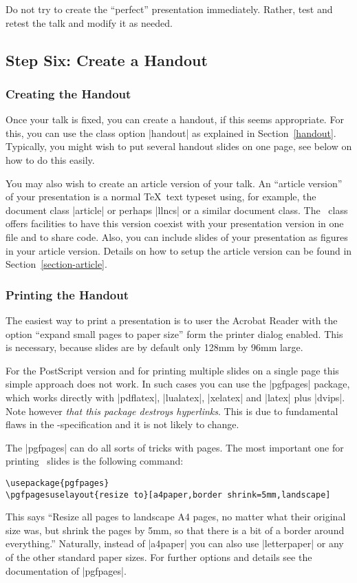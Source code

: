 Do not try to create the ``perfect'' presentation immediately. Rather, test and retest the talk and modify it as needed.


\subsection{Step Six: Create a Handout}

\subsubsection{Creating the Handout}

Once your talk is fixed, you can create a handout, if this seems appropriate. For this, you can use the class option |handout| as explained in Section~\ref{handout}. Typically, you might wish to put several handout slides on one page, see below on how to do this easily.

You may also wish to create an article version of your talk. An ``article version'' of your presentation is a normal \TeX\ text typeset using, for example, the document class |article| or perhaps |llncs| or a similar document class. The \beamer\ class offers facilities to have this version coexist with your presentation version in one file and to share code. Also, you can include slides of your presentation as figures in your article version. Details on how to setup the article version can be found in Section~\ref{section-article}.

\subsubsection{Printing the Handout}
\label{section-printing-version}

The easiest way to print a presentation is to user the Acrobat Reader with the option ``expand small pages to paper size'' form the printer dialog enabled. This is necessary, because slides are by default only 128mm by 96mm large.

For the PostScript version and for printing multiple slides on a single page this simple approach does not work. In such cases you can use the |pgfpages| package, which works directly with |pdflatex|, |lualatex|, |xelatex| and |latex| plus |dvips|. Note however \emph{that this package destroys hyperlinks}. This is due to fundamental flaws in the \pdf-specification and it is not likely to change.

The |pgfpages| can do all sorts of tricks with pages. The most important one for printing \beamer\ slides is the following command:
\begin{verbatim}
\usepackage{pgfpages}
\pgfpagesuselayout{resize to}[a4paper,border shrink=5mm,landscape]
\end{verbatim}
This says ``Resize all pages to landscape A4 pages, no matter what their original size was, but shrink the pages by 5mm, so that there is a bit of a border around everything.'' Naturally, instead of |a4paper| you can also use |letterpaper| or any of the other standard paper sizes. For further options and details see the documentation of |pgfpages|.

